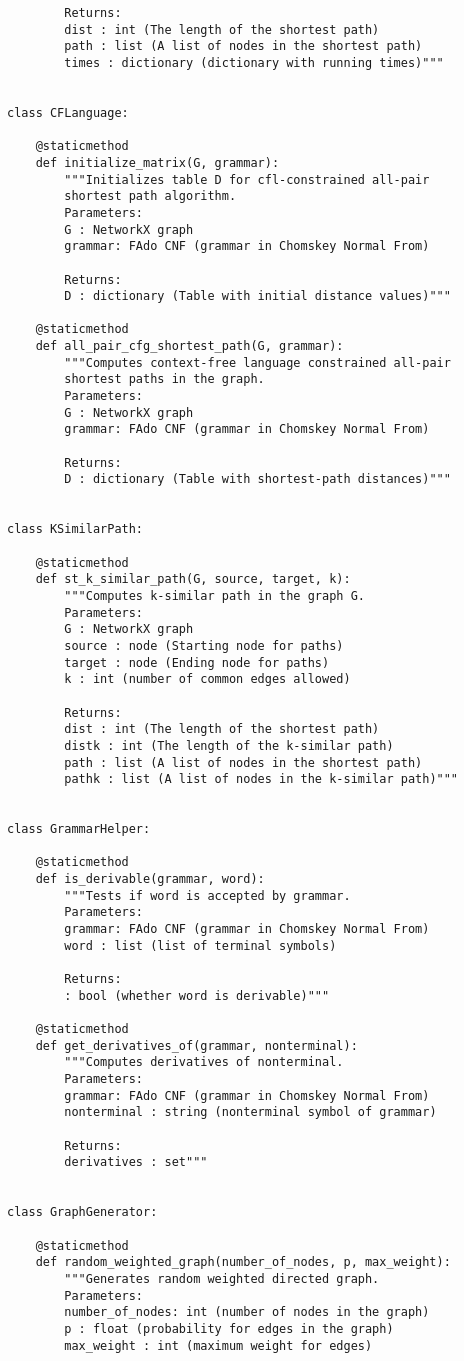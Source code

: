 \documentclass[]{article}
\numberwithin{equation}{section}
\begin{document}
\begin{appendices}
\begin{lstlisting}
		Returns:
		dist : int (The length of the shortest path)
		path : list (A list of nodes in the shortest path)
		times : dictionary (dictionary with running times)"""


class CFLanguage:

	@staticmethod
	def initialize_matrix(G, grammar):
		"""Initializes table D for cfl-constrained all-pair
		shortest path algorithm.
		Parameters:
		G : NetworkX graph
		grammar: FAdo CNF (grammar in Chomskey Normal From)
		
		Returns:
		D : dictionary (Table with initial distance values)"""
	
	@staticmethod
	def all_pair_cfg_shortest_path(G, grammar):
		"""Computes context-free language constrained all-pair
		shortest paths in the graph.
		Parameters:
		G : NetworkX graph
		grammar: FAdo CNF (grammar in Chomskey Normal From)
		
		Returns:
		D : dictionary (Table with shortest-path distances)"""


class KSimilarPath:

	@staticmethod
	def st_k_similar_path(G, source, target, k):
		"""Computes k-similar path in the graph G.
		Parameters:
		G : NetworkX graph
		source : node (Starting node for paths)
		target : node (Ending node for paths)
		k : int (number of common edges allowed)
		
		Returns:
		dist : int (The length of the shortest path)
		distk : int (The length of the k-similar path)
		path : list (A list of nodes in the shortest path)
		pathk : list (A list of nodes in the k-similar path)"""


class GrammarHelper:

	@staticmethod
	def is_derivable(grammar, word):
		"""Tests if word is accepted by grammar.
		Parameters:
		grammar: FAdo CNF (grammar in Chomskey Normal From)
		word : list (list of terminal symbols)
		
		Returns:
		: bool (whether word is derivable)"""
	
	@staticmethod
	def get_derivatives_of(grammar, nonterminal):
		"""Computes derivatives of nonterminal.
		Parameters:
		grammar: FAdo CNF (grammar in Chomskey Normal From)
		nonterminal : string (nonterminal symbol of grammar)
		
		Returns:
		derivatives : set"""


class GraphGenerator:

	@staticmethod
	def random_weighted_graph(number_of_nodes, p, max_weight):
		"""Generates random weighted directed graph.
		Parameters:
		number_of_nodes: int (number of nodes in the graph)
		p : float (probability for edges in the graph)
		max_weight : int (maximum weight for edges)
		

\end{lstlisting}
\end{appendices}
\end{document}
